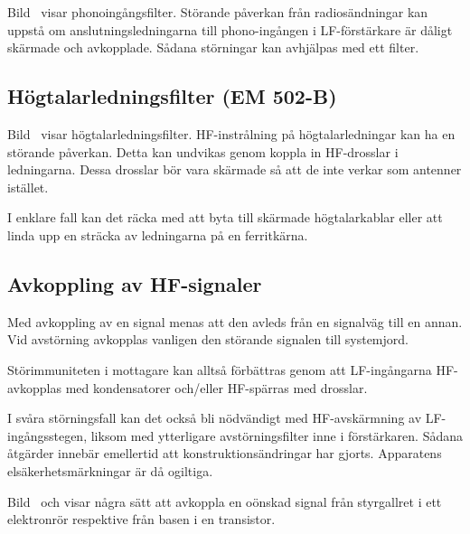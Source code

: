Bild~ visar phonoingångsfilter.
Störande påverkan från radiosändningar kan uppstå om anslutningsledningarna
till phono-ingången i LF-förstärkare är dåligt skärmade och avkopplade.
Sådana störningar kan avhjälpas med ett filter.


\subsection{Högtalarledningsfilter (EM 502-B)}

Bild~ visar högtalarledningsfilter.
HF-instrålning på högtalarledningar kan ha en störande påverkan.
Detta kan undvikas genom koppla in HF-drosslar i ledningarna.
Dessa drosslar bör vara skärmade så att de inte verkar som antenner istället.

I enklare fall kan det räcka med att byta till skärmade högtalarkablar
eller att linda upp en sträcka av ledningarna på en ferritkärna.


\subsection{Avkoppling av HF-signaler}




Med avkoppling av en signal menas att den avleds från en signalväg till en
annan.
Vid avstörning avkopplas vanligen den störande signalen till systemjord.

Störimmuniteten i mottagare kan alltså förbättras genom att LF-ingångarna
HF-avkopplas med kondensatorer och/eller HF-spärras med drosslar.

I svåra störningsfall kan det också bli nödvändigt med HF-avskärmning av
LF-ingångsstegen, liksom med ytterligare avstörningsfilter inne i förstärkaren.
Sådana åtgärder innebär emellertid att konstruktionsändringar har gjorts.
Apparatens elsäkerhetsmärkningar är då ogiltiga.

Bild~ och  visar några sätt att
avkoppla en oönskad signal från styrgallret i ett elektronrör respektive från
basen i en transistor.

